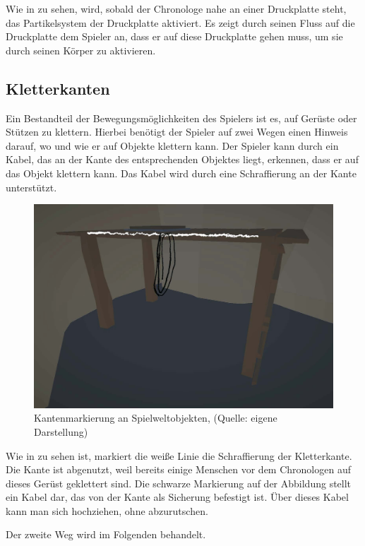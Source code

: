 Wie in  zu sehen, wird, sobald der Chronologe nahe an einer Druckplatte steht, das Partikelsystem der Druckplatte aktiviert. Es zeigt durch seinen Fluss auf die Druckplatte dem Spieler an, dass er auf diese Druckplatte gehen muss, um sie durch seinen Körper zu aktivieren.

\subsection{Kletterkanten}\label{sec:leadge}
Ein Bestandteil der Bewegungsmöglichkeiten des Spielers ist es, auf Gerüste oder Stützen zu klettern. Hierbei benötigt der Spieler auf zwei Wegen einen Hinweis darauf, wo und wie er auf Objekte klettern kann.
Der Spieler kann durch ein Kabel, das an der Kante des entsprechenden Objektes liegt, erkennen, dass er auf das Objekt klettern kann. Das Kabel wird durch eine Schraffierung an der Kante unterstützt.

\begin{figure}[ht]
\centering
\includegraphics[width=0.8\linewidth]{content/pictures/leadge_wireframe.jpg}
\caption{Kantenmarkierung an Spielweltobjekten, (Quelle: eigene Darstellung)}
\label{fig:leadge}
\end{figure}

Wie in  zu sehen ist, markiert die weiße Linie die Schraffierung der Kletterkante. Die Kante ist abgenutzt, weil bereits einige Menschen vor dem Chronologen auf dieses Gerüst geklettert sind. 
Die schwarze Markierung auf der Abbildung stellt ein Kabel dar, das von der Kante als Sicherung befestigt ist. Über dieses Kabel kann man sich hochziehen, ohne abzurutschen.

Der zweite Weg wird im Folgenden  behandelt.

